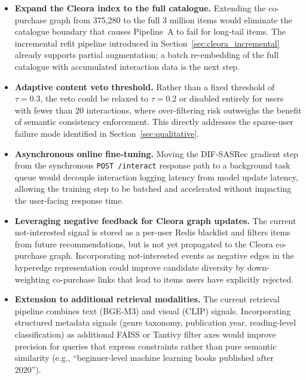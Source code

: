 \begin{itemize}
    \item \textbf{Expand the Cleora index to the full catalogue.}
    Extending the co-purchase graph from 375{,}280 to the full 3 million items would eliminate the catalogue boundary that causes Pipeline~A to fail for long-tail items.
    The incremental refit pipeline introduced in Section~\ref{sec:cleora_incremental} already supports partial augmentation; a batch re-embedding of the full catalogue with accumulated interaction data is the next step.

    \item \textbf{Adaptive content veto threshold.}
    Rather than a fixed threshold of $\tau = 0.3$, the veto could be relaxed to $\tau = 0.2$ or disabled entirely for users with fewer than 20 interactions, where over-filtering risk outweighs the benefit of semantic consistency enforcement.
    This directly addresses the sparse-user failure mode identified in Section~\ref{sec:qualitative}.

    \item \textbf{Asynchronous online fine-tuning.}
    Moving the DIF-SASRec gradient step from the synchronous \texttt{POST /interact} response path to a background task queue would decouple interaction logging latency from model update latency, allowing the training step to be batched and accelerated without impacting the user-facing response time.

    \item \textbf{Leveraging negative feedback for Cleora graph updates.}
    The current not-interested signal is stored as a per-user Redis blacklist and filters items from future recommendations, but is not yet propagated to the Cleora co-purchase graph.
    Incorporating not-interested events as negative edges in the hyperedge representation could improve candidate diversity by down-weighting co-purchase links that lead to items users have explicitly rejected.

    \item \textbf{Extension to additional retrieval modalities.}
    The current retrieval pipeline combines text (BGE-M3) and visual (CLIP) signals.
    Incorporating structured metadata signals (genre taxonomy, publication year, reading-level classification) as additional FAISS or Tantivy filter axes would improve precision for queries that express constraints rather than pure semantic similarity (e.g., ``beginner-level machine learning books published after 2020'').
\end{itemize}
